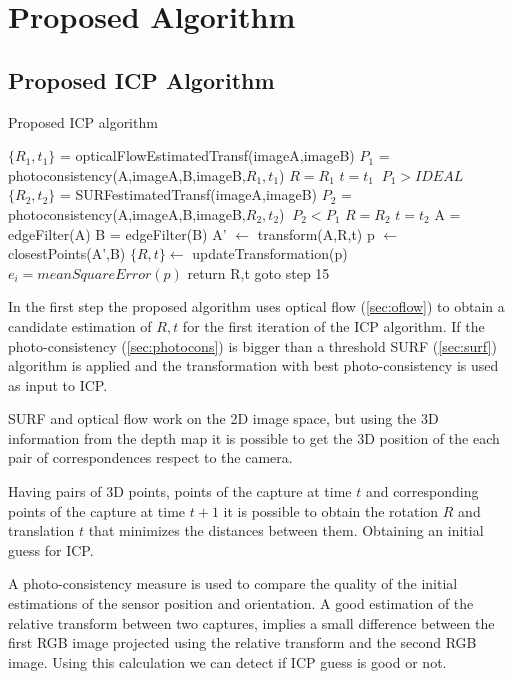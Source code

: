 \section{Proposed Algorithm}

\subsection{Proposed ICP Algorithm}

\begin{algorithm}
\caption{Proposed ICP algorithm}
\begin{algorithmic}[1]
\State $\{R_1,t_1\}$ = opticalFlowEstimatedTransf(imageA,imageB)
\State $P_1$ = photoconsistency(A,imageA,B,imageB,$R_1,t_1$)
\State $R=R_1$
\State $t=t_1$
\If $\ P_1 > IDEAL$
    \State $\{R_2,t_2\}$ = SURFestimatedTransf(imageA,imageB)
    \State  $P_2$ = photoconsistency(A,imageA,B,imageB,$R_2,t_2$)
    \If $\ P_2 < P_1$
        \State $R=R_2$
        \State $t=t_2$
    \EndIf
\EndIf
\State A = edgeFilter(A)
\State B = edgeFilter(B)
\State A' $\leftarrow$ transform(A,R,t) 
\State p $\leftarrow$ closestPoints(A',B)
\State $\{R,t\} \gets$ updateTransformation(p)
\State $e_i = meanSquareError(p)$
	\State return R,t
\Else
	\State goto step 15
\EndIf
\end{algorithmic}
\end{algorithm}


In the first step the proposed algorithm uses optical flow (\ref{sec:oflow}) to obtain a candidate estimation of 
$R,t$ for the first iteration of the ICP algorithm. If the photo-consistency (\ref{sec:photocons}) is bigger than a threshold 
SURF (\ref{sec:surf}) algorithm is applied and the transformation with best photo-consistency is used as input to ICP.

SURF and optical flow work on the 2D image space, but using 
the 3D information from the depth map it is possible to get the 3D position 
of the each pair of correspondences respect to the camera. 

Having pairs of 3D points, points of the capture at time $t$ and corresponding points 
of the capture at time $t + 1$ it is possible to obtain the rotation $R$ and translation $t$
 that minimizes the distances between them. Obtaining an initial guess 
 for ICP. 

A photo-consistency measure is used to compare the quality of the initial estimations of the sensor
 position and orientation. A good estimation of the relative transform between two captures, implies 
a small difference between the first RGB image projected using the relative transform and the second RGB 
image. Using this calculation we can detect if ICP guess is good or not.

